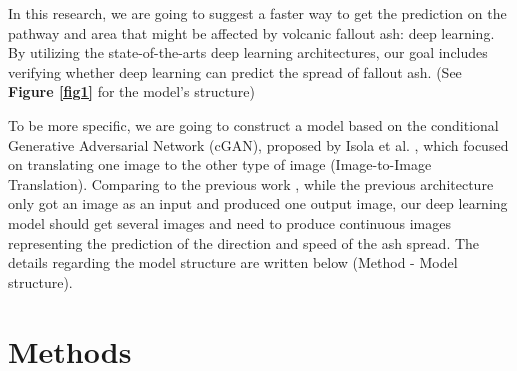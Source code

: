 \documentclass{article}
\begin{document}
\begin{doublespacing}
{  In this research, we are going to suggest a faster way to get the prediction on the pathway and 
  area that might be affected by volcanic fallout ash: deep learning. By utilizing the
  state-of-the-arts deep learning architectures, our goal includes verifying whether deep learning 
  can predict the spread of fallout ash. (See \textbf{Figure \ref{fig1}} for the model's structure)

  \fontsize{10pt}{10.5pt} 

  To be more specific, we are going to construct a model based on the conditional Generative 
  Adversarial Network (cGAN), proposed by Isola et al. \cite{isola2016imagetoimage}, which focused 
  on translating one image to the other type of image (Image-to-Image Translation). Comparing to the 
  previous work \cite{isola2016imagetoimage}, while the previous architecture only got an image as 
  an input and produced one output image, our deep learning model should get several images and need
  to produce continuous images representing the prediction of the direction and speed of the ash 
  spread. The details regarding the model structure are written below (Method - Model structure).
}

\section{Methods}  %
\fontsize{11pt}{11pt} \selectfont {
}
\end{doublespacing}
\end{document}
